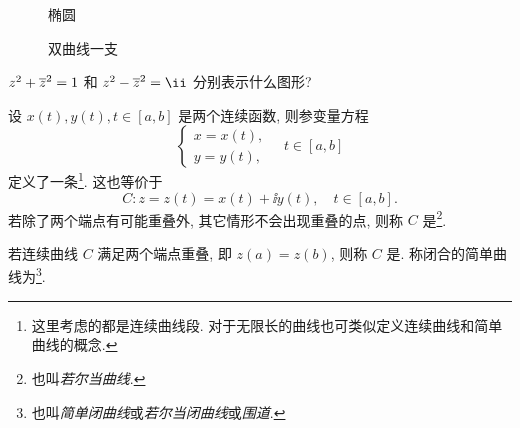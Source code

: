 \begin{figure}[!htb]
\begin{minipage}{.24\textwidth}
    \caption{椭圆}
  \end{minipage}
  \begin{minipage}{.24\textwidth}
    \centering
    \caption{双曲线一支}
  \end{minipage}
\end{figure}

\begin{exercise}
  $z^2+\overline z^2=1$ 和 $z^2-\ov z^2=\ii$ 分别表示什么图形?
\end{exercise}

设 $x(t),y(t),t\in[a,b]$ 是两个连续函数,
则参变量方程
\[
  \begin{cases}
    x=x(t),\\
    y=y(t),
  \end{cases}\quad 
  t\in[a,b]
\]
定义了一条\footnote{%
  这里考虑的都是连续曲线段. 对于无限长的曲线也可类似定义连续曲线和简单曲线的概念.
}.
这也等价于
\[
  C:z=z(t)=x(t)+\ii y(t),\quad t\in[a,b].
\]
若除了两个端点有可能重叠外, 其它情形不会出现重叠的点, 则称 $C$ 是\footnote{%
  也叫\emph{若尔当曲线}.
}.

若连续曲线 $C$ 满足两个端点重叠, 即 $z(a)=z(b)$, 则称 $C$ 是.
称闭合的简单曲线为\footnote{%
  也叫\emph{简单闭曲线}或\emph{若尔当闭曲线}或\emph{围道}.
}.

